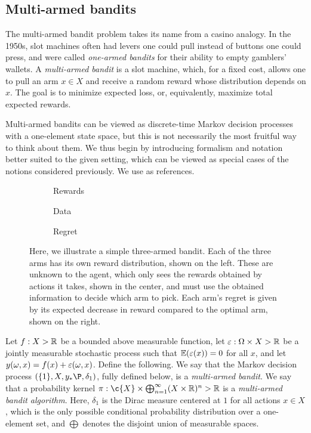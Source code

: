 \documentclass[11pt]{book}
\begin{document}
\subsection{Multi-armed bandits}

The multi-armed bandit problem takes its name from a casino analogy.
In the 1950s, slot machines often had levers one could pull instead of buttons one could press, and were called \emph{one-armed bandits} for their ability to empty gamblers' wallets.
A \emph{multi-armed bandit} is a slot machine, which, for a fixed cost, allows one to pull an arm $x \in X$ and receive a random reward whose distribution depends on $x$.
The goal is to minimize  expected loss, or, equivalently, maximize total expected rewards.

Multi-armed bandits can be viewed as discrete-time Markov decision processes with a one-element state space, but this is not necessarily the most fruitful way to think about them.
We thus begin by introducing formalism and notation better suited to the given setting, which can be viewed as special cases of the notions considered previously.
We use \textcite{slivkins19,lattimore20} as references.

\begin{figure}
\begin{subfigure}{0.3\textwidth}

\caption{Rewards}
\end{subfigure}
\begin{subfigure}{0.3\textwidth}

\caption{Data}
\end{subfigure}
\begin{subfigure}{0.3\textwidth}

\caption{Regret}
\end{subfigure}
\caption[Multi-armed bandits]{Here, we illustrate a simple three-armed bandit. Each of the three arms has its own reward distribution, shown on the left. These are unknown to the agent, which only sees the rewards obtained by actions it takes, shown in the center, and must use the obtained information to decide which arm to pick. Each arm's regret is given by its expected decrease in reward compared to the optimal arm, shown on the right.}
\label{fig:mab}
\end{figure}

\begin{definition}
Let $f : X \-> \mathbb{R}$ be a bounded above measurable function, let $\varepsilon : \Omega \times X \-> \mathbb{R}$ be a jointly measurable stochastic process such that $\operatorname{\mathbb{E}}(\varepsilon(x)) = 0$ for all $x$, and let $y(\omega,x) = f(x) + \varepsilon(\omega,x)$.
Define the following.
\1 We say that the Markov decision process $(\{1\},X,y_*\P,\delta_{1})$, fully defined below, is a \emph{multi-armed bandit}.
\2 We say that a probability kernel  $\pi : \c{X} \x \bigoplus_{n=1}^\infty (X \x \R)^n \-> \R$ is a \emph{multi-armed bandit algorithm}.
\0
Here, $\delta_1$ is the Dirac measure centered at $1$ for all actions $x\in X$, which is the only possible conditional probability distribution over a one-element set, and $\bigoplus$ denotes the disjoint union of measurable spaces.
\end{definition}
\end{document}
